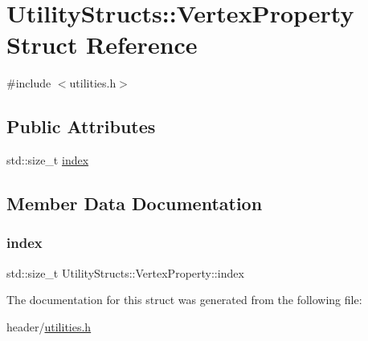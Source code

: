 \hypertarget{struct_utility_structs_1_1_vertex_property}{}\section{Utility\+Structs\+:\+:Vertex\+Property Struct Reference}
\label{struct_utility_structs_1_1_vertex_property}


{\ttfamily \#include $<$utilities.\+h$>$}

\subsection*{Public Attributes}
\begin{DoxyCompactItemize}
\item 
std\+::size\+\_\+t \hyperlink{struct_utility_structs_1_1_vertex_property_a636cb729438e999aa3d9a17ac39d8641_a636cb729438e999aa3d9a17ac39d8641}{index}
\end{DoxyCompactItemize}


\subsection{Member Data Documentation}
\mbox{\label{struct_utility_structs_1_1_vertex_property_a636cb729438e999aa3d9a17ac39d8641_a636cb729438e999aa3d9a17ac39d8641}} 
\subsubsection{\texorpdfstring{index}{index}}
{\footnotesize\ttfamily std\+::size\+\_\+t Utility\+Structs\+::\+Vertex\+Property\+::index}



The documentation for this struct was generated from the following file\+:\begin{DoxyCompactItemize}
\item 
header/\hyperlink{utilities_8h}{utilities.\+h}\end{DoxyCompactItemize}
